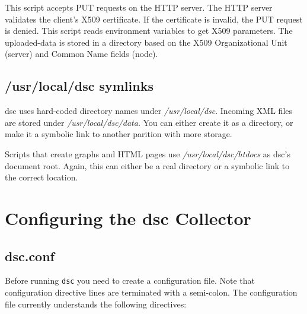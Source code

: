 \documentclass{report}
\def\dsc{{\sc dsc}}
\begin{document}
This script accepts PUT requests on the HTTP server.  The HTTP
server validates the client's X509 certificate.  If the certificate
is invalid, the PUT request is denied.  This script reads environment
variables to get X509 parameters.  The uploaded-data is stored in
a directory based on the X509 Organizational Unit (server) and
Common Name fields (node).

\section{/usr/local/dsc symlinks}

{\dsc} uses hard-coded directory names under {\em /usr/local/dsc\/}.
Incoming XML files are stored under {\em /usr/local/dsc/data\/}.
You can either create it as a directory, or make it a symbolic link
to another parition with more storage.

Scripts that create graphs and HTML pages use {\em /usr/local/dsc/htdocs\/}
as {\dsc}'s document root.  Again, this can either be a real directory
or a symbolic link to the correct location.

\chapter{Configuring the {\dsc} Collector}

\section{dsc.conf}

Before running {\tt dsc\/} you need to create a configuration file.
Note that configuration directive lines are terminated with a semi-colon.
The configuration file currently understands the following directives:
\end{document}
